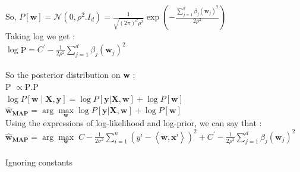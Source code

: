 \documentclass[a4paper,11pt]{article}
\begin{document}
\begin{mlsolution}
So, 
\begin{math}
P[\textbf{w}] = \mathcal{N}\left ( 0, \rho^{2}.I_{d} \right ) = \frac{1}{\sqrt{\left ( 2\pi \right)^{d}\rho^{2}}}\exp\left ( - \frac{\sum_{j = 1}^{d} \beta_{j}\left ( \textbf{w}_{j} \right )^{2} }{2\rho^{2}} \right )
\end{math}
\\Taking log we get :\\

\begin{math}
\log \end{math}\;P\begin{math}[\textbf{w}]  = C^{'} - \frac{1}{2\rho^{2}} \sum_{j = 1}^{d} \beta_{j}\left ( \textbf{w}_{j} \right )^{2} 
\end{math}\\\\So the posterior distribution on \textbf{w} :\\

P \begin{math}[\textbf{w}\mid\textbf{X},\textbf{y}]  \propto \end{math}\;P\begin{math}[\textbf{y}|\textbf{X}, \textbf{w}] . \end{math}\;P\begin{math}[\textbf{w}]\end{math}\\

\begin{math}
\log P[\textbf{w}\mid\textbf{X},\textbf{y}]  = \log P[\textbf{y}|\textbf{X}, \textbf{w}] + \log P[\textbf{w}]
\end{math}\\

\begin{math}
\widehat{\textbf{w}}_{\textbf{MAP}}  = \arg \underset{\textbf{w}}{\max} \log P[\textbf{y}|\textbf{X}, \textbf{w}] + \log P[\textbf{w}]
\end{math}\\
Using the expressions of log-likelihood and log-prior, we can say that :\\

\begin{math}
\widehat{\textbf{w}}_{\textbf{MAP}}  = \arg \underset{\textbf{w}}{\max} \;
C - \frac{1}{2\sigma^{2}} \sum_{i = 1}^{n} \left ( y^{i} - \left \langle \textbf{w}, \textbf{x}^{i} \right \rangle \right )^{2} + C^{'} - \frac{1}{2\rho^{2}} \sum_{j = 1}^{d} \beta_{j}\left ( \textbf{w}_{j} \right )^{2}
\end{math}\\\\
Ignoring constants \\


\end{mlsolution}
\end{document}
